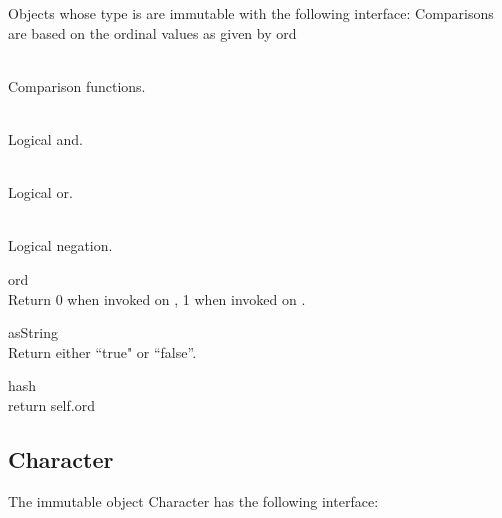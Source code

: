 \noindent
Objects whose type is  are immutable with the following interface:
Comparisons are based on the ordinal values as given by ord

\begin{desc}
  \item[\kw{function} \opd{$>$} \/\LB{}\tn{Boolean}\/\RB{} \returns{} \/\LB{}\tn{Boolean}\/\RB{}]
  \item[\kw{function} \opd{$>=$} \/\LB{}\tn{Boolean}\/\RB{} \returns{} \/\LB{}\tn{Boolean}\/\RB{}]
  \item[\kw{function} \opd{$<$} \/\LB{}\tn{Boolean}\/\RB{} \returns{} \/\LB{}\tn{Boolean}\/\RB{}]
  \item[\kw{function} \opd{$<=$} \/\LB{}\tn{Boolean}\/\RB{} \returns{} \/\LB{}\tn{Boolean}\/\RB{}]
  \item[\kw{function} \opd{$=$} \/\LB{}\tn{Boolean}\/\RB{} \returns{} \/\LB{}\tn{Boolean}\/\RB{}]
  \item[\kw{function} \opd{$!=$} \/\LB{}\tn{Boolean}\/\RB{} \returns{} \/\LB{}\tn{Boolean}\/\RB{}]~\\
  Comparison functions.
  \item[\kw{function} \opd{$\&$} \/\LB{}\tn{Boolean}\/\RB{} \returns{} \/\LB{}\tn{Boolean}\/\RB{}]~\\
    Logical and.
  \item[\kw{function} \opd{$|$} \/\LB{}\tn{Boolean}\/\RB{} \returns{} \/\LB{}\tn{Boolean}\/\RB{}]~\\
    Logical or.
  \item[\kw{function} \opd{$!$}  \returns{} \/\LB{}\tn{Boolean}\/\RB{}]~\\
    Logical negation.
  \item[\kw{function} ord \returns{} \/\LB{}\tn{Integer}\/\RB{}]~\\
    Return 0 when invoked on , 1 when invoked on .
  \item[\kw{function} asString \returns{} \/\LB{}\tn{String}\/\RB{}]~\\
    Return either ``true" or ``false''.
  \item[\kw{function} hash \returns{} \/\LB{}\tn{Integer}\/\RB{}]~\\
    return self.ord
\end{desc}



\subsection{Character}
\label{builtin Character}
\noindent The immutable object Character has the following interface:

